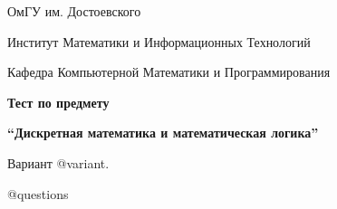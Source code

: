 \documentclass[russian]{article}
\begin{document}
\begin{flushright}
ОмГУ им. Достоевского
\par Институт Математики и Информационных Технологий
\par Кафедра Компьютерной Математики и Программирования
\end{flushright}

\begin{center}
\par\textbf{\large{}Тест по предмету}{\large\par}
\par \textbf{\large{}``Дискретная математика и математическая логика''}{\large\par}

\begin{spacing}{3}
\par Вариант @variant.
\end{spacing}

\end{center}

\begin{enumerate}
@questions
\end{enumerate}
\end{document}
